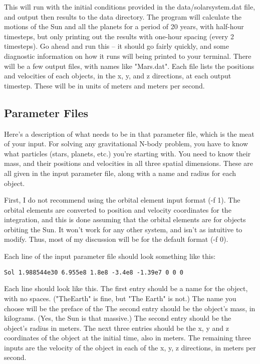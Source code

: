\documentclass{article}
\begin{document}
This will run with the initial conditions provided in the data/solarsystem.dat file, and output then results to the data directory.  The program will calculate the motions of the Sun and all the planets for a period of 20 years, with half-hour timesteps, but only printing out the results with one-hour spacing (every 2 timesteps).  Go ahead and run this -- it should go fairly quickly, and some diagnostic information on how it runs will being printed to your terminal.  There will be a few output files, with names like "Mars.dat".  Each file lists the positions and velocities of each objects, in the x, y, and z directions, at each output timestep.  These will be in units of meters and meters per second.

\subsection{Parameter Files}\label{subsec:pfiles}

Here's a description of what needs to be in that parameter file, which is the meat of your input.  For solving any gravitational N-body problem, you have to know what particles (stars, planets, etc.) you're starting with.  You need to know their mass, and their positions and velocities in all three spatial dimensions.  These are all given in the input parameter file, along with a name and radius for each object.

First, I do not recommend using the orbital element input format (-f 1).  The orbital elements are converted to position and velocity coordinates for the integration, and this is done assuming that the orbital elements are for objects orbiting the Sun.  It won't work for any other system, and isn't as intuitive to modify.  Thus, most of my discussion will be for the default format (-f 0).

Each line of the input parameter file should look something like this:

\begin{lstlisting}
Sol 1.988544e30 6.955e8 1.8e8 -3.4e8 -1.39e7 0 0 0
\end{lstlisting}

Each line should look like this.  The first entry should be a name for the object, with no spaces.  ("TheEarth" is fine, but "The Earth" is not.)  The name you choose will be the preface of the   The second entry should be the object's mass, in kilograms.  (Yes, the Sun is that massive.)  The second entry should be the object's radius in meters.  The next three entries should be the x, y and z coordinates of the object at the initial time, also in meters.  The remaining three inputs are the velocity of the object in each of the x, y, z directions, in meters per second.
\end{document}
